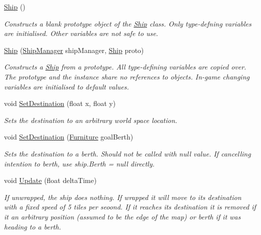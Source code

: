 \begin{DoxyCompactItemize}
\item 
\hyperlink{class_ship_ad5e5b275a4936c74279a8efb7412cc2c}{Ship} ()
\begin{DoxyCompactList}\small\item\em Constructs a blank prototype object of the \hyperlink{class_ship}{Ship} class. Only type-\/defning variables are initialised. Other variables are not safe to use. \end{DoxyCompactList}\item 
\hyperlink{class_ship_a4cefe98d88c50eb364b5baec61e23b95}{Ship} (\hyperlink{class_ship_manager}{Ship\+Manager} ship\+Manager, \hyperlink{class_ship}{Ship} proto)
\begin{DoxyCompactList}\small\item\em Constructs a \hyperlink{class_ship}{Ship} from a prototype. All type-\/defining variables are copied over. The prototype and the instance share no references to objects. In-\/game changing variables are initialised to default values. \end{DoxyCompactList}\item 
void \hyperlink{class_ship_a5c5ee984c2e67e8a771ad920ef513818}{Set\+Destination} (float x, float y)
\begin{DoxyCompactList}\small\item\em Sets the destination to an arbitrary world space location. \end{DoxyCompactList}\item 
void \hyperlink{class_ship_a59115e2eaadf1012769b415743f5e549}{Set\+Destination} (\hyperlink{class_furniture}{Furniture} goal\+Berth)
\begin{DoxyCompactList}\small\item\em Sets the destination to a berth. Should not be called with null value. If cancelling intention to berth, use {\ttfamily ship.\+Berth = null} directly. \end{DoxyCompactList}\item 
void \hyperlink{class_ship_a6fd507fb621f00ba01a76fa685cc0d66}{Update} (float delta\+Time)
\begin{DoxyCompactList}\small\item\em If unwrapped, the ship does nothing. If wrapped it will move to its destination with a fixed speed of 5 tiles per seoond. If it reaches its destination it is removed if it an arbitrary position (assumed to be the edge of the map) or berth if it was heading to a berth. \end{DoxyCompactList}\item 

\end{DoxyCompactItemize}
